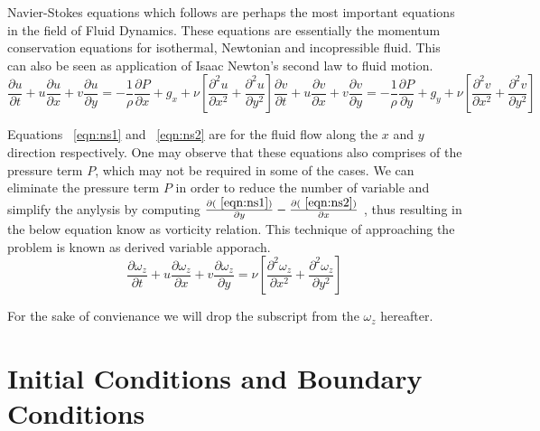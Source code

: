 \documentclass{article}
\begin{document}
Navier-Stokes equations which follows are perhaps the most important equations in the field of Fluid Dynamics. These equations are essentially the momentum conservation equations for isothermal, Newtonian and incopressible fluid. This can also be seen as application of Isaac Newton's second law to fluid motion.
\begin{subequations}
\begin{equation}
\label{eqn:ns1}
\frac{\partial u}{\partial t} + u\frac{\partial u}{\partial x} + v\frac{\partial u}{\partial y}= -\frac{1}{\rho}\frac{\partial P}{\partial x} + g_x + \nu \left [ \frac{\partial^2 u}{\partial x^2} +  \frac{\partial^2 u}{\partial y^2} \right ]
\end{equation}

\begin{equation}
\label{eqn:ns2}
\frac{\partial v}{\partial t} + u\frac{\partial v}{\partial x} + v\frac{\partial v}{\partial y}= -\frac{1}{\rho}\frac{\partial P}{\partial y} + g_y + \nu \left [ \frac{\partial^2 v}{\partial x^2} +  \frac{\partial^2 v}{\partial y^2} \right ]
\end{equation}
\end{subequations}

Equations ~\ref{eqn:ns1} and ~\ref{eqn:ns2} are for the fluid flow along the $x$ and $y$ direction respectively.  One may observe that these equations also comprises of the pressure term $P$, which may not be required in some of the cases. We can eliminate the pressure term $P$ in order to reduce the number of variable and simplify the anylysis by computing $\frac{\partial (~\ref{eqn:ns1})}{\partial y} - \frac{\partial (~\ref{eqn:ns2})}{\partial x} $ , thus resulting in the below equation know as vorticity relation. This technique of approaching the problem is known as derived variable apporach. 
\begin{equation}
\label{eqn:vorticityFnEqn}
\frac{\partial \omega_z}{\partial t} + u\frac{\partial \omega_z}{\partial x} + v\frac{\partial \omega_z}{\partial y}= \nu \left [ \frac{\partial^2 \omega_z}{\partial x^2} +  \frac{\partial^2 \omega_z}{\partial y^2} \right ]
\end{equation}

For the sake of convienance we will drop the subscript from the $\omega_z$ hereafter.




\section{Initial Conditions and Boundary Conditions}
\end{document}
